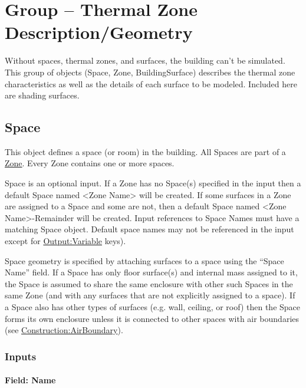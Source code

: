 \section{Group -- Thermal Zone Description/Geometry}\label{group-thermal-zone-descriptiongeometry}

Without spaces, thermal zones, and surfaces, the building can't be simulated. This group of objects (Space, Zone, BuildingSurface) describes the thermal zone characteristics as well as the details of each surface to be modeled. Included here are shading surfaces.

\subsection{Space}\label{space}

This object defines a space (or room) in the building. All Spaces are part of a \hyperref[zone]{Zone}.
Every Zone contains one or more spaces.

Space is an optional input. If a Zone has no Space(s) specified in the input then a default Space named \textless{}Zone Name\textgreater{} will be created.
If some surfaces in a Zone are assigned to a Space and some are not, then a default Space
named \textless{}Zone Name\textgreater{}-Remainder will be created. 
Input references to Space Names must have a matching Space object. 
Default space names may not be referenced in the input except for \hyperref[outputvariable]{Output:Variable} keys).

Space geometry is specified by attaching surfaces to a space using the ``Space Name'' field. If a Space has only floor surface(s) and internal mass assigned to it, the Space is assumed to share the same enclosure with other such Spaces in the same Zone (and with any surfaces that are not explicitly assigned to a space). If a Space also has other types of surfaces (e.g. wall, ceiling, or roof) then the Space forms its own enclosure unless it is connected to other spaces with air boundaries (see \hyperref[constructionairboundary]{Construction:AirBoundary}).

\subsubsection{Inputs}\label{space-inputs-048}

\paragraph{Field: Name}\label{space-object-name}

